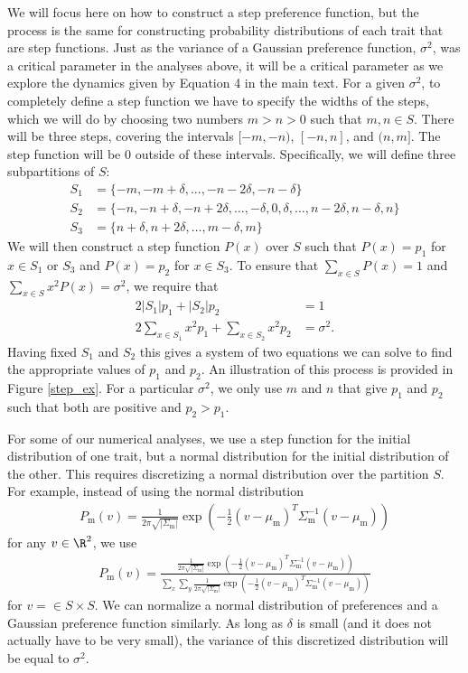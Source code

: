 \documentclass{article}
\newcommand{\x}[1]{\text{#1}}
\begin{document}
We will focus here on how to construct a step preference function, but the process is the same for constructing probability distributions of each trait that are step functions. Just as the variance of a Gaussian preference function, $\sigma^2$, was a critical parameter in the analyses above, it will be a critical parameter as we explore the dynamics given by Equation 4 in the main text. For a given $\sigma^2$, to completely define a step function we have to specify the widths of the steps, which we will do by choosing two numbers $m>n>0$ such that $m,n\in S$. There will be three steps, covering the intervals $[-m,-n)$, $[-n,n]$, and $(n,m]$. The step function will be $0$ outside of these intervals. Specifically, we will define three subpartitions of $S$:
\begin{align*}
S_1 & = \{-m,-m+\delta,...,-n-2\delta,-n-\delta\}
\\ S_2&=\{-n,-n+\delta,-n+2\delta,\dots,-\delta,0,\delta,\dots,n-2\delta,n-\delta,n\}
\\ S_3&=\{n+\delta,n+2\delta,\dots,m-\delta,m\}
\end{align*}
We will then construct a step function $P(x)$ over $S$ such that $P(x)=p_1$ for $x\in S_1$ or $S_3$ and $P(x)=p_2$ for $x\in S_3$. To ensure that $\sum_{x\in S}P(x)=1$ and $\sum_{x\in S}x^2P(x)=\sigma^2$, we require that 
\begin{align*}
2|S_1|p_1+|S_2|p_2&=1
\\2\sum_{x\in S_1}x^2p_1+\sum_{x\in S_2}x^2p_2&=\sigma^2.
\end{align*}
Having fixed $S_1$ and $S_2$ this gives a system of two equations we can solve to find the appropriate values of $p_1$ and $p_2$. An illustration of this process is provided in Figure \ref{step_ex}. For a particular $\sigma^2$, we only use $m$ and $n$ that give $p_1$ and $p_2$ such that both are positive and $p_2>p_1$.

For some of our numerical analyses, we use a step function for the initial distribution of one trait, but a normal distribution for the initial distribution of the other. This requires discretizing a normal distribution over the partition $S$. For example, instead of using the normal distribution
\begin{align*}
P_\x{m}(v)=\frac{1}{2\pi\sqrt{|\Sigma_\x{m}|}}\exp\left(-\frac{1}{2}(v-\mu_\x{m})^T\Sigma_\x{m}^{-1}(v-\mu_\x{m})\right)
\end{align*}
for any $v\in\R^2$, we use
\begin{align*}
P_\x{m}(v)=\frac{\frac{1}{2\pi\sqrt{|\Sigma_\x{m}|}}\exp\left(-\frac{1}{2}(v-\mu_\x{m})^T\Sigma_\x{m}^{-1}(v-\mu_\x{m})\right)}{\sum_x\sum_y\frac{1}{2\pi\sqrt{|\Sigma_\x{m}|}}\exp\left(-\frac{1}{2}(v-\mu_\x{m})^T\Sigma_\x{m}^{-1}(v-\mu_\x{m})\right)}
\end{align*}
for $v=\in S\times S$. We can normalize a normal distribution of preferences and a Gaussian preference function similarly. As long as $\delta$ is small (and it does not actually have to be very small), the variance of this discretized distribution will be equal to $\sigma^2$.
\end{document}
